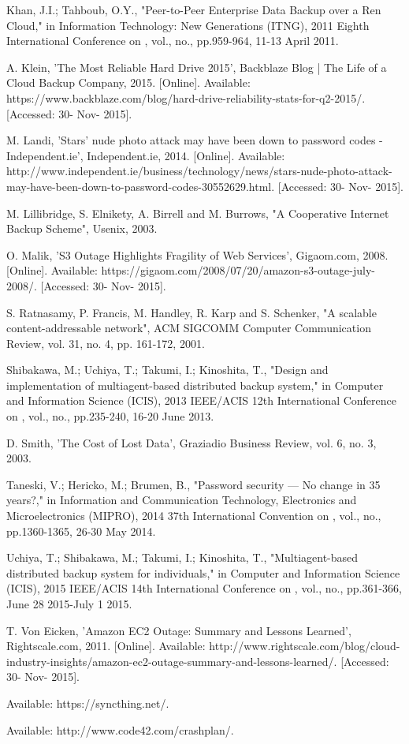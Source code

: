 \documentclass{scu-thesis}
\begin{document}
\begin{thebibliography}{9}
Khan, J.I.; Tahboub, O.Y., "Peer-to-Peer Enterprise Data Backup over a Ren Cloud," in Information Technology: New Generations (ITNG), 2011 Eighth International Conference on , vol., no., pp.959-964, 11-13 April 2011.

A.  Klein, 'The Most Reliable Hard Drive 2015', Backblaze Blog | The Life of a Cloud Backup Company, 2015. [Online]. Available: https://www.backblaze.com/blog/hard-drive-reliability-stats-for-q2-2015/. [Accessed: 30- Nov- 2015].

M.  Landi, 'Stars' nude photo attack may have been down to password codes - Independent.ie', Independent.ie, 2014. [Online]. Available: http://www.independent.ie/business/technology/news/stars-nude-photo-attack-may-have-been-down-to-password-codes-30552629.html. [Accessed: 30- Nov- 2015].

M.  Lillibridge, S.  Elnikety, A.  Birrell and M.  Burrows, "A Cooperative Internet Backup Scheme", Usenix, 2003.

O.  Malik, 'S3 Outage Highlights Fragility of Web Services', Gigaom.com, 2008. [Online]. Available: https://gigaom.com/2008/07/20/amazon-s3-outage-july-2008/. [Accessed: 30- Nov- 2015].

S.  Ratnasamy, P.  Francis, M.  Handley, R.  Karp and S.  Schenker, "A scalable content-addressable network", ACM SIGCOMM Computer Communication Review, vol. 31, no. 4, pp. 161-172, 2001.

Shibakawa, M.; Uchiya, T.; Takumi, I.; Kinoshita, T., "Design and implementation of multiagent-based distributed backup system," in Computer and Information Science (ICIS), 2013 IEEE/ACIS 12th International Conference on , vol., no., pp.235-240, 16-20 June 2013.


D.  Smith, 'The Cost of Lost Data', Graziadio Business Review, vol. 6, no. 3, 2003.

Taneski, V.; Hericko, M.; Brumen, B., "Password security — No change in 35 years?," in Information and Communication Technology, Electronics and Microelectronics (MIPRO), 2014 37th International Convention on , vol., no., pp.1360-1365, 26-30 May 2014.

Uchiya, T.; Shibakawa, M.; Takumi, I.; Kinoshita, T., "Multiagent-based distributed backup system for individuals," in Computer and Information Science (ICIS), 2015 IEEE/ACIS 14th International Conference on , vol., no., pp.361-366, June 28 2015-July 1 2015.

T.  Von Eicken, 'Amazon EC2 Outage: Summary and Lessons Learned', Rightscale.com, 2011. [Online]. Available: http://www.rightscale.com/blog/cloud-industry-insights/amazon-ec2-outage-summary-and-lessons-learned/. [Accessed: 30- Nov- 2015].

Available: https://syncthing.net/.

Available: http://www.code42.com/crashplan/.

\end{thebibliography}

\backmatter
\end{document}
